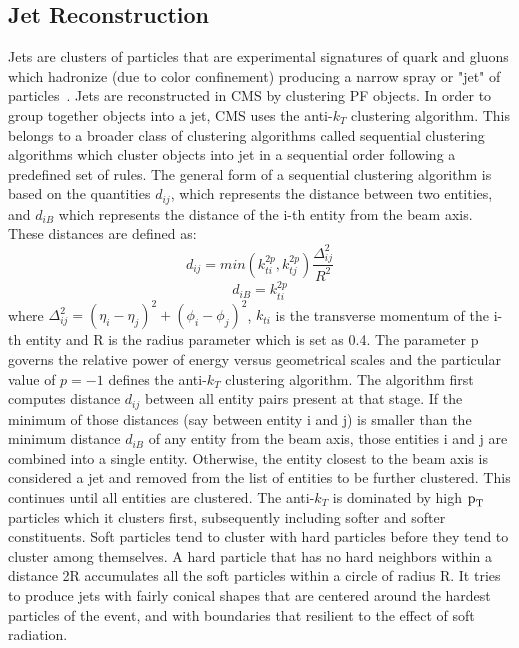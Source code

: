 \subsection{Jet Reconstruction}
\label{jet_recon}
Jets are clusters of particles that are experimental signatures of quark and gluons which hadronize (due to color confinement) producing a narrow spray or "jet" of particles~\cite{jet_recon}. Jets are reconstructed in CMS by clustering PF objects. In order to group together objects into a jet, CMS uses the anti-$k_{T}$ clustering algorithm. This belongs to a broader class of clustering algorithms called sequential clustering algorithms which cluster objects into jet in a sequential order following a predefined set of rules. The general form of a sequential clustering algorithm is based on the quantities  $d_{ij}$, which represents the distance between two entities, and $d_{iB}$ which represents the distance of the i-th entity from the beam axis. These distances are defined as:
\begin{equation*}
  d_{ij}=min(k_{ti}^{2p},k_{tj}^{2p})\frac{\Delta_{ij}^{2}}{R^2}
\end{equation*}
\begin{equation*}
  d_{iB}=k_{ti}^{2p}
\end{equation*}
where $\Delta_{ij}^{2}=(\eta_i-\eta_j)^2+(\phi_i-\phi_j)^2$, $k_{ti}$ is the transverse momentum of the i-th entity and R is the radius parameter which is set as 0.4. The parameter p governs the relative power of energy versus geometrical scales and the particular value of $p=-1$ defines the anti-$k_{T}$ clustering algorithm. The algorithm first computes distance $d_{ij}$ between all entity pairs present at that stage. If the minimum of those distances (say between entity i and j) is smaller than the minimum distance $d_{iB}$ of any entity from the beam axis, those entities i and j are combined into a single entity. Otherwise, the entity closest to the beam axis is considered a jet and removed from the list of entities to be further clustered. This continues until all entities are clustered. The anti-$k_{T}$ is dominated by high $\text{p}_\text{T}$ particles which it clusters first, subsequently including softer and softer constituents. Soft particles tend to cluster with hard particles before they tend to cluster among themselves. A hard particle that has no hard neighbors within a distance 2R accumulates all the soft particles within a circle of radius R. It tries to produce jets with fairly conical shapes that are centered around the hardest particles of the event, and with boundaries that resilient to the effect of soft radiation.

